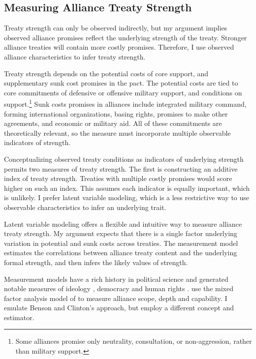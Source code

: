 \documentclass[12pt]{article}
\begin{document}
\subsection{Measuring Alliance Treaty Strength} 


Treaty strength can only be observed indirectly, but my argument implies observed alliance promises reflect the underlying strength of the treaty. 
Stronger alliance treaties will contain more costly promises. 
Therefore, I use observed alliance characteristics to infer treaty strength.


Treaty strength depends on the potential costs of core support, and supplementary sunk cost promises in the pact. 
The potential costs are tied to core commitments of defensive or offensive military support, and conditions on support.\footnote{Some alliances promise only neutrality, consultation, or non-aggression, rather than military support.}  
Sunk costs promises in alliances include integrated military command, forming international organizations, basing rights, promises to make other agreements, and economic or military aid. 
All of these commitments are theoretically relevant, so the measure must incorporate multiple observable indicators of strength. 


Conceptualizing observed treaty conditions as indicators of underlying strength permits two measures of treaty strength. 
The first is constructing an additive index of treaty strength. 
Treaties with multiple costly promises would score higher on such an index. 
This assumes each indicator is equally important, which is unlikely. 
I prefer latent variable modeling, which is a less restrictive way to use observable characteristics to infer an underlying trait. 


Latent variable modeling offers a flexible and intuitive way to measure alliance treaty strength. 
My argument expects that there is a single factor underlying variation in potential and sunk costs across treaties.  
The measurement model estimates the correlations between alliance treaty content and the underlying formal strength, and then infers the likely values of strength. 


Measurement models have a rich history in political science and generated notable measures of ideology \citep{Clintonetal2004}, democracy \citep{TreierJackman2008} and human rights \citep{Fariss2014}. 
\citet{BensonClinton2016} use the mixed factor analysis model of \citet{Quinn2004} to measure alliance scope, depth and capability.
I emulate Benson and Clinton's approach, but employ a different concept and estimator. 
\end{document}
